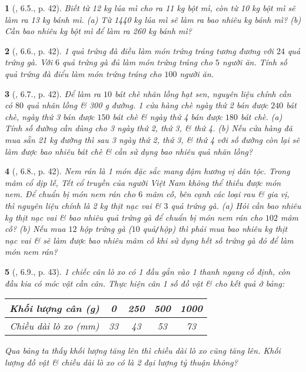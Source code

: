 \documentclass{article}
\newtheorem{baitoan}{}
\begin{document}
\begin{baitoan}[\cite{Binh_boi_duong_Toan_7_tap_1}, 6.5., p. 42]
	Biết từ {\rm12 kg} lúa mì cho ra {\rm11 kg} bột mì, còn từ {\rm10 kg} bột mì sẽ làm ra {\rm13 kg} bánh mì. (a) Từ {\rm1440 kg} lúa mì sẽ làm ra bao nhiêu {\rm kg} bánh mì? (b) Cần bao nhiêu {\rm kg} bột mì để làm ra {\rm260 kg} bánh mì?
\end{baitoan}

\begin{baitoan}[\cite{Binh_boi_duong_Toan_7_tap_1}, 6.6., p. 42]
	1 quả trứng đà điều làm món trứng tráng tương đương với $24$ quả trứng gà. Với $6$ quả trứng gà đủ làm món trứng tráng cho $5$ người ăn. Tính số quả trứng đà điểu làm món trứng tráng cho $100$ người ăn.
\end{baitoan}

\begin{baitoan}[\cite{Binh_boi_duong_Toan_7_tap_1}, 6.7., p. 42]
	Để làm ra $10$ bát chè nhãn lồng hạt sen, nguyên liệu chính cần có $80$ quả nhãn lồng \& {\rm300 g} đường. 1 cửa hàng chè ngày thứ 2 bán được $240$ bát chè, ngày thứ 3 bán được $150$ bát chè \& ngày thứ 4 bán được $180$ bát chè. (a) Tính số đường cần dùng cho 3 ngày thứ 2, thứ 3, \& thứ 4. (b) Nếu cửa hàng đã mua sẵn {\rm21 kg} đường thì sau 3 ngày thứ 2, thứ 3, \& thứ 4 với số đường còn lại sẽ làm được bao nhiêu bát chè \& cần sử dụng bao nhiêu quả nhãn lồng?
\end{baitoan}

\begin{baitoan}[\cite{Binh_boi_duong_Toan_7_tap_1}, 6.8., p. 42]
	Nem rán là 1 món đặc sắc mang đậm hương vị dân tộc. Trong mâm cổ dịp lễ, Tết cổ truyền của người Việt Nam không thể thiếu được món nem. Để chuẩn bị món nem rán cho $6$ mâm cỗ, bên cạnh các loại rau \& gia vị, thì nguyên liệu chính là {\rm2 kg} thịt nạc vai \& $3$ quả trứng gà. (a) Hỏi cần bao nhiêu {\rm kg} thịt nạc vai \& bao nhiêu quả trứng gà để chuẩn bị món nem rán cho $102$ mâm cỗ? (b) Nếu mua $12$ hộp trứng gà ($10$ quả{\tt/}hộp) thì phải mua bao nhiêu {\rm kg} thịt nạc vai \& sẽ làm được bao nhiêu mâm cỗ khi sử dụng hết số trứng gà đó để làm món nem rán?
\end{baitoan}

\begin{baitoan}[\cite{Binh_boi_duong_Toan_7_tap_1}, 6.9., p. 43]
	1 chiếc cân lò xo có 1 đầu gắn vào 1 thanh ngang cố định, còn đầu kia có móc vật cần cân. Thực hiện cân 1 số đồ vật \& cho kết quả ở bảng:
	\begin{table}[H]
		\centering
		\begin{tabular}{|c|c|c|c|c|}
			\hline
			Khối lượng cân (g) & 0 & 250 & 500 & 1000 \\
			\hline
			Chiều dài lò xo (mm) & 33 & 43 & 53 & 73 \\
			\hline
		\end{tabular}
	\end{table}
	\noindent Qua bảng ta thấy khối lượng tăng lên thì chiều dài lò xo cũng tăng lên. Khối lượng đồ vật \& chiều dài lò xo có là 2 đại lượng tỷ thuận không?
\end{baitoan}
\end{document}
